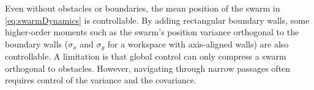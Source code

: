 Even without obstacles or boundaries, the mean position of the swarm in \eqref{eq:swarmDynamics} is controllable.  By adding rectangular boundary walls, some higher-order moments such as the swarm's position variance orthogonal to the boundary walls ($\sigma_x$ and $\sigma_y$ for a workspace with axis-aligned walls) are also controllable. 
A limitation is that global control can only compress a swarm orthogonal to obstacles.  However, navigating through narrow passages often requires control of the variance and the covariance.

